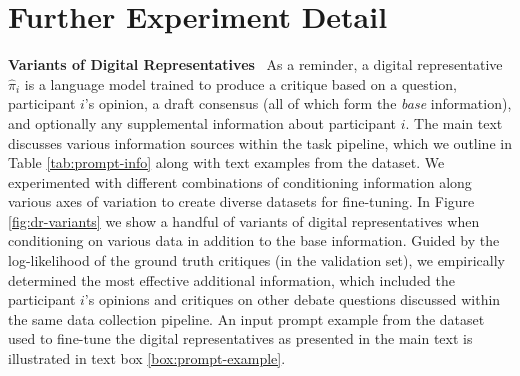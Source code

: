 \section{Further Experiment Detail}\label{app:bonus}

\textbf{Variants of Digital Representatives}~ As a reminder, a digital representative $\hat{\pi}_{i}$ is a language model trained to produce a critique based on a question, participant $i$'s opinion, a draft consensus (all of which form the \textit{base} information), and optionally any supplemental information about participant $i$. The main text discusses various information sources within the task pipeline, which we outline in Table \ref{tab:prompt-info} along with text examples from the dataset. We experimented with different combinations of conditioning information along various axes of variation to create diverse datasets for fine-tuning. In Figure \ref{fig:dr-variants} we show a handful of variants of digital representatives when conditioning on various data in addition to the base information. Guided by the log-likelihood of the ground truth critiques (in the validation set), we empirically determined the most effective additional information, which included the participant $i$'s opinions and critiques on other debate questions discussed within the same data collection pipeline. An input prompt example from the dataset used to fine-tune the digital representatives as presented in the main text is illustrated in text box \ref{box:prompt-example}.

